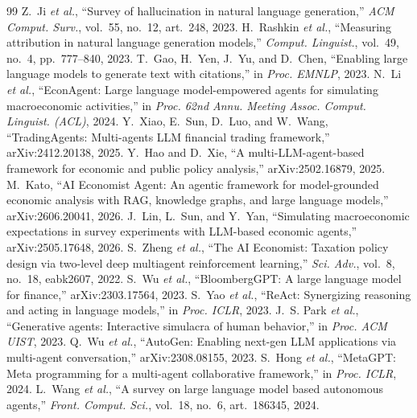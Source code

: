 \documentclass[conference]{IEEEtran}
\begin{document}
\begin{thebibliography}{99}
 Z.~Ji \emph{et al.}, ``Survey of hallucination in natural language generation,'' \emph{ACM Comput. Surv.}, vol.~55, no.~12, art.~248, 2023.
 H.~Rashkin \emph{et al.}, ``Measuring attribution in natural language generation models,'' \emph{Comput. Linguist.}, vol.~49, no.~4, pp.~777--840, 2023.
 T.~Gao, H.~Yen, J.~Yu, and D.~Chen, ``Enabling large language models to generate text with citations,'' in \emph{Proc. EMNLP}, 2023.
 N.~Li \emph{et al.}, ``EconAgent: Large language model-empowered agents for simulating macroeconomic activities,'' in \emph{Proc. 62nd Annu. Meeting Assoc. Comput. Linguist. (ACL)}, 2024.
 Y.~Xiao, E.~Sun, D.~Luo, and W.~Wang, ``TradingAgents: Multi-agents LLM financial trading framework,'' arXiv:2412.20138, 2025.
 Y.~Hao and D.~Xie, ``A multi-LLM-agent-based framework for economic and public policy analysis,'' arXiv:2502.16879, 2025.
 M.~Kato, ``AI Economist Agent: An agentic framework for model-grounded economic analysis with RAG, knowledge graphs, and large language models,'' arXiv:2606.20041, 2026.
 J.~Lin, L.~Sun, and Y.~Yan, ``Simulating macroeconomic expectations in survey experiments with LLM-based economic agents,'' arXiv:2505.17648, 2026.
 S.~Zheng \emph{et al.}, ``The AI Economist: Taxation policy design via two-level deep multiagent reinforcement learning,'' \emph{Sci. Adv.}, vol.~8, no.~18, eabk2607, 2022.
 S.~Wu \emph{et al.}, ``BloombergGPT: A large language model for finance,'' arXiv:2303.17564, 2023.
 S.~Yao \emph{et al.}, ``ReAct: Synergizing reasoning and acting in language models,'' in \emph{Proc. ICLR}, 2023.
 J.~S. Park \emph{et al.}, ``Generative agents: Interactive simulacra of human behavior,'' in \emph{Proc. ACM UIST}, 2023.
 Q.~Wu \emph{et al.}, ``AutoGen: Enabling next-gen LLM applications via multi-agent conversation,'' arXiv:2308.08155, 2023.
 S.~Hong \emph{et al.}, ``MetaGPT: Meta programming for a multi-agent collaborative framework,'' in \emph{Proc. ICLR}, 2024.
 L.~Wang \emph{et al.}, ``A survey on large language model based autonomous agents,'' \emph{Front. Comput. Sci.}, vol.~18, no.~6, art.~186345, 2024.

\end{thebibliography}
\end{document}
